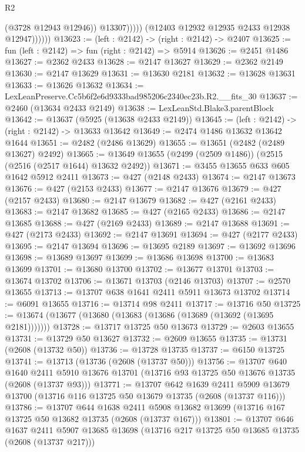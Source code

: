 \begin{lexlean}{R2}
\begin{coremodule}
                          (@3728 @12943 @12946))
                        @13307)))))
              (@12403 @12932 @12935 @2433 @12938 @12947))))))
@13623 := (left : @2142) -> (right : @2142) -> @2407
@13625 := fun (left : @2142) => fun (right : @2142) => @5914
@13626 := @2451 @1486
@13627 := @2362 @2433
@13628 := @2147 @13627
@13629 := @2362 @2149
@13630 := @2147 @13629
@13631 := @13630 @2181
@13632 := @13628 @13631
@13633 := @13626 @13632
@13634 := LexLeanPreserve.Cc5b6f2e6d9333bad985206c2340ec23b.R2.__fits_30
@13637 := @2460 (@13634 @2433 @2149)
@13638 := LexLeanStd.Blake3.parentBlock
@13642 := @13637 (@5925 (@13638 @2433 @2149))
@13645 := (left : @2142) -> (right : @2142) -> @13633 @13642
@13649 := @2474 @1486 @13632 @13642 @1644
@13651 := @2482 (@2486 @13629)
@13655 := @13651 (@2482 (@2489 @13627) @2492)
@13665 := @13649 @13655 (@2499 (@2509 @1486)) (@2515 (@2516 (@2517 @1644) @13632 @2492))
@13671 := @3455 @13655 @633 @605 @1642 @5912 @2411
@13673 := @427 (@2148 @2433)
@13674 := @2147 @13673
@13676 := @427 (@2153 @2433)
@13677 := @2147 @13676
@13679 := @427 (@2157 @2433)
@13680 := @2147 @13679
@13682 := @427 (@2161 @2433)
@13683 := @2147 @13682
@13685 := @427 (@2165 @2433)
@13686 := @2147 @13685
@13688 := @427 (@2169 @2433)
@13689 := @2147 @13688
@13691 := @427 (@2173 @2433)
@13692 := @2147 @13691
@13694 := @427 (@2177 @2433)
@13695 := @2147 @13694
@13696 := @13695 @2189
@13697 := @13692 @13696
@13698 := @13689 @13697
@13699 := @13686 @13698
@13700 := @13683 @13699
@13701 := @13680 @13700
@13702 := @13677 @13701
@13703 := @13674 @13702
@13706 := @13671 @13703 (@2146 @13703)
@13707 := @2570 @13655
@13713 := @13707 @638 @1641 @2411 @5911 @13673 @13702
@13714 := @6091 @13655
@13716 := @13714 @98 @2411
@13717 := @13716 @50
@13725 := @13674 (@13677 (@13680 (@13683 (@13686 (@13689 (@13692 (@13695 @2181)))))))
@13728 := @13717 @13725 @50 @13673
@13729 := @2603 @13655
@13731 := @13729 @50 @13627
@13732 := @2609 @13655
@13735 := @13731 (@2608 (@13732 @50))
@13736 := @13728 @13735
@13737 := @6150 @13725
@13741 := @13713 (@13736 (@2608 (@13737 @50)))
@13756 := @13707
    @640
    @1640
    @2411
    @5910
    @13676
    @13701
    (@13716 @93 @13725 @50 @13676 @13735 (@2608 (@13737 @93)))
@13771 := @13707
    @642
    @1639
    @2411
    @5909
    @13679
    @13700
    (@13716 @116 @13725 @50 @13679 @13735 (@2608 (@13737 @116)))
@13786 := @13707
    @644
    @1638
    @2411
    @5908
    @13682
    @13699
    (@13716 @167 @13725 @50 @13682 @13735 (@2608 (@13737 @167)))
@13801 := @13707
    @646
    @1637
    @2411
    @5907
    @13685
    @13698
    (@13716 @217 @13725 @50 @13685 @13735 (@2608 (@13737 @217)))

\end{coremodule}
\end{lexlean}
